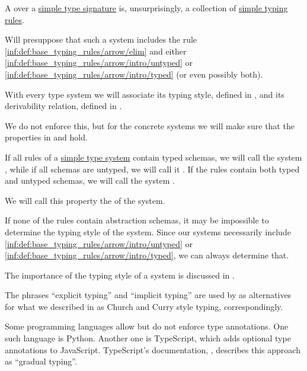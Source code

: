 \begin{definition}\label{def:simple_type_system}\mimprovised
  A  over a \hyperref[def:simple_type_signature]{simple type signature} is, unsurprisingly, a collection of \hyperref[def:simple_typing_rule]{simple typing rules}.

  Will presuppose that such a system includes the rule \ref{inf:def:base_typing_rules/arrow/elim} and either \ref{inf:def:base_typing_rules/arrow/intro/untyped} or \ref{inf:def:base_typing_rules/arrow/intro/typed} (or even possibly both).
\end{definition}
\begin{comments}
  \item With every type system we will associate its typing style, defined in , and its derivability relation, defined in .

  \item We do not enforce this, but for the concrete systems we will make sure that the properties in  and  hold.
\end{comments}

\begin{definition}\label{def:simple_type_system_style}\mimprovised
  If all rules of a \hyperref[def:simple_type_system]{simple type system} contain typed schemas, we will call the system , while if all schemas are untyped, we will call it . If the rules contain both typed and untyped schemas, we will call the system .

  We will call this property the  of the system.
\end{definition}
\begin{comments}
  \item If none of the rules contain abstraction schemas, it may be impossible to determine the typing style of the system. Since our systems necessarily include \ref{inf:def:base_typing_rules/arrow/intro/untyped} or \ref{inf:def:base_typing_rules/arrow/intro/typed}, we can always determine that.

  \item The importance of the typing style of a system is discussed in .

  \item The phrases \enquote{explicit typing} and \enquote{implicit typing} are used by  as alternatives for what we described in  as Church and Curry style typing, correspondingly.

  \item Some programming languages allow but do not enforce type annotations. One such language is Python. Another one is TypeScript, which adds optional type annotations to JavaScript. TypeScript's documentation, \cite{TypeScript:5.7:handbook}, describes this approach as \enquote{gradual typing}.
\end{comments}

